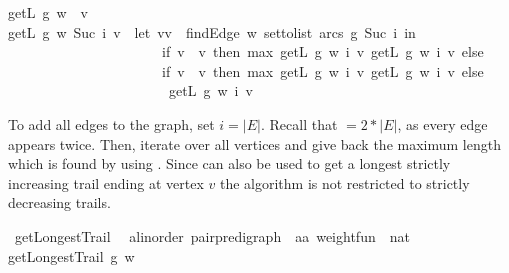 \begin{isabellebody}
{\isachardoublequoteopen}getL\ g\ w\ {}\ v\ {\isacharequal}\ {}{\isachardoublequoteclose}\ {\isacharbar}\ \ \isanewline
{\isachardoublequoteopen}getL\ g\ w\ {\isacharparenleft}Suc\ i{\isacharparenright}\ v\ {\isacharequal}\ {\isacharparenleft}let\ {\isacharparenleft}vv\ {\isacharequal}\ {\isacharparenleft}findEdge\ w\ {\isacharparenleft}set{\isacharunderscore}to{\isacharunderscore}list\ {\isacharparenleft}arcs\ g{\isacharparenright}{\isacharparenright}\ {\isacharparenleft}Suc\ i{\isacharparenright}{\isacharparenright}\ in\ \isanewline
\ \ \ \ \ \ \ \ \ \ \ \ \ \ \ \ \ \ \ \ \ \ {\isacharparenleft}if\ v\ {\isacharequal}\ v\ then\ max\ {\isacharparenleft}{\isacharparenleft}getL\ g\ w\ i\ v\ {\isacharparenleft}getL\ g\ w\ i\ v{\isacharparenright}\ else\ \isanewline
\ \ \ \ \ \ \ \ \ \ \ \ \ \ \ \ \ \ \ \ \ \ {\isacharparenleft}if\ v\ {\isacharequal}\ v\ then\ max\ {\isacharparenleft}{\isacharparenleft}getL\ g\ w\ i\ v\ {\isacharparenleft}getL\ g\ w\ i\ v{\isacharparenright}\ else\ \isanewline
\ \ \ \ \ \ \ \ \ \ \ \ \ \ \ \ \ \ \ \ \ \ \ getL\ g\ w\ i\ v{\isacharparenright}{\isacharparenright}{\isacharparenright}{\isachardoublequoteclose}%
\begin{isamarkuptext}%
To add all edges to the graph, set $i=|E|$. Recall that  $= 2*|E|$, 
as every edge appears twice. 
Then, iterate over all vertices and give back the
maximum length which is found by using . Since  can also be used to get a longest 
strictly increasing trail ending at vertex $v$ the algorithm is not restricted to strictly decreasing trails.%
\end{isamarkuptext}\isamarkuptrue%
\isamarkupfalse%
\ getLongestTrail\ {\isacharcolon}{\isacharcolon}\ \isanewline
{\isachardoublequoteopen}{\isacharparenleft}{\isacharprime}a{\isacharcolon}{\isacharcolon}linorder{\isacharparenright}\ pair{\isacharunderscore}pre{\isacharunderscore}digraph\ {\isasymRightarrow}\ {\isacharparenleft}{\isacharprime}a{\isasymtimes}{\isacharprime}a{\isacharparenright}\ weight{\isacharunderscore}fun\ {\isasymRightarrow}\ nat{\isachardoublequoteclose}\ \isanewline
{\isachardoublequoteopen}getLongestTrail\ g\ w\ {\isacharequal}\ \isanewline

\end{isabellebody}
